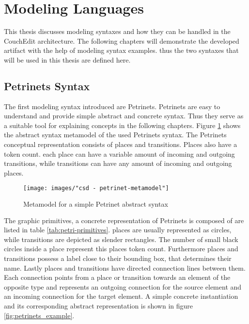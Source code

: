 \section{Modeling Languages}
\label{sec:modeling-languages}
This thesis discusses modeling syntaxes and how they can be handled in the CouchEdit architecture. The following chapters will demonstrate the developed artifact with the help of modeling syntax examples. thus the two syntaxes that will be used in this thesis are defined here.

\subsection{Petrinets Syntax}
\label{sec:petrinets}
The first modeling syntax introduced are Petrinets. Petrinets are easy to understand and provide simple abstract and concrete syntax. Thus they serve as a suitable tool for explaining concepts in the following chapters. Figure \ref{fig:petrinets_metamodel} shows the abstract syntax metamodel of the used Petrinets syntax. The Petrinets conceptual representation consists of places and transitions. Places also have a token count. each place can have a variable amount of incoming and outgoing transitions, while transitions can have any amount of incoming and outgoing places. 

\begin{figure}[H]
  \centering
  \texttt{[image: images/"csd - petrinet-metamodel"]}
  \caption{Metamodel for a simple Petrinet abstract syntax}
  \label{fig:petrinets_metamodel}
\end{figure}

The graphic primitives, a concrete representation of Petrinets is composed of are listed in table \ref{tab:petri-primitives}. places are usually represented as circles, while transitions are depicted as slender rectangles. The number of small black circles inside a place represent this places token count. Furthermore places and transitions possess a label close to their bounding box, that determines their name. Lastly places and transitions have directed connection lines between them. Each connection points from a place or transition towards an element of the opposite type and represents an outgoing connection for the source element and an incoming connection for the target element. A simple concrete instantiation and its corresponding abstract representation is shown in figure \ref{fig:petrinets_example}.

